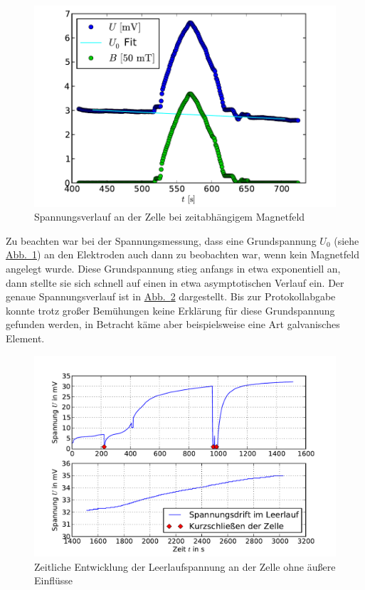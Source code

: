 \documentclass[11pt]{scrartcl}
\newcommand{\abb}[1]{\hyperref[#1]{Abb.~\ref{#1}}}
\begin{document}
\begin{figure}[ht]
\begin{center}
\includegraphics[width=1.0\textwidth]{images/messkurve_spannung.pdf}
\end{center}
\vspace{-1.5\baselineskip}
\caption{Spannungsverlauf an der Zelle bei zeitabhängigem Magnetfeld}
\label{messkurve_spannung}
\end{figure}

Zu beachten war bei der Spannungsmessung, dass eine Grundspannung $U_0$ (siehe \abb{messkurve_spannung}) an den Elektroden auch dann zu beobachten war, wenn kein Magnetfeld angelegt wurde. Diese Grundspannung stieg anfangs in etwa exponentiell an, dann stellte sie sich schnell auf einen in etwa asymptotischen Verlauf ein. Der genaue Spannungsverlauf ist in \abb{driftspannung} dargestellt. Bis zur Protokollabgabe konnte trotz großer Bemühungen keine Erklärung für diese Grundspannung gefunden werden, in Betracht käme aber beispielsweise eine Art galvanisches Element.  


\begin{figure}[H]
\begin{center}
\includegraphics[width=1.0\textwidth]{images/driftspannung.pdf}
\end{center}
\vspace{-1.5\baselineskip}
\caption{Zeitliche Entwicklung der Leerlaufspannung an der Zelle ohne äußere Einflüsse}
\label{driftspannung}
\end{figure}
\end{document}
